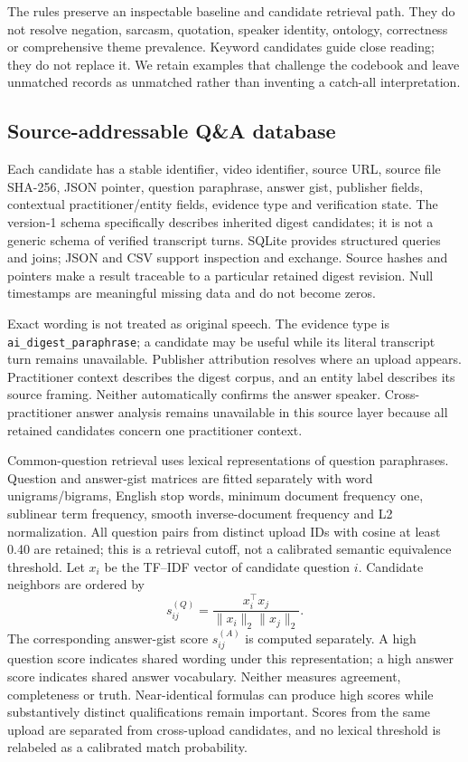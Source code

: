 The rules preserve an inspectable baseline and candidate retrieval path. They do not resolve negation, sarcasm, quotation, speaker identity, ontology, correctness or comprehensive theme prevalence. Keyword candidates guide close reading; they do not replace it. We retain examples that challenge the codebook and leave unmatched records as unmatched rather than inventing a catch-all interpretation.

\subsection{Source-addressable Q\&A database}
Each candidate has a stable identifier, video identifier, source URL, source file SHA-256, JSON pointer, question paraphrase, answer gist, publisher fields, contextual practitioner/entity fields, evidence type and verification state. The version-1 schema specifically describes inherited digest candidates; it is not a generic schema of verified transcript turns. SQLite provides structured queries and joins; JSON and CSV support inspection and exchange. Source hashes and pointers make a result traceable to a particular retained digest revision. Null timestamps are meaningful missing data and do not become zeros.

Exact wording is not treated as original speech. The evidence type is \texttt{ai\_digest\_paraphrase}; a candidate may be useful while its literal transcript turn remains unavailable. Publisher attribution resolves where an upload appears. Practitioner context describes the digest corpus, and an entity label describes its source framing. Neither automatically confirms the answer speaker. Cross-practitioner answer analysis remains unavailable in this source layer because all retained candidates concern one practitioner context.

Common-question retrieval uses lexical representations of question paraphrases. Question and answer-gist matrices are fitted separately with word unigrams/bigrams, English stop words, minimum document frequency one, sublinear term frequency, smooth inverse-document frequency and L2 normalization. All question pairs from distinct upload IDs with cosine at least 0.40 are retained; this is a retrieval cutoff, not a calibrated semantic equivalence threshold. Let $x_i$ be the TF--IDF vector of candidate question $i$. Candidate neighbors are ordered by
\begin{equation}
 s_{ij}^{(Q)}=\frac{x_i^\top x_j}{\lVert x_i\rVert_2\lVert x_j\rVert_2}.
\end{equation}
The corresponding answer-gist score $s_{ij}^{(A)}$ is computed separately. A high question score indicates shared wording under this representation; a high answer score indicates shared answer vocabulary. Neither measures agreement, completeness or truth. Near-identical formulas can produce high scores while substantively distinct qualifications remain important. Scores from the same upload are separated from cross-upload candidates, and no lexical threshold is relabeled as a calibrated match probability.


